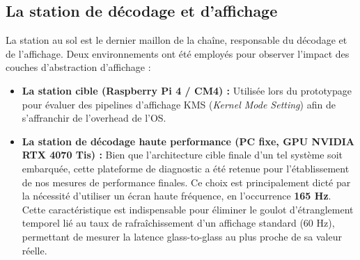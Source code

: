 \subsection{La station de décodage et d'affichage}
La station au sol est le dernier maillon de la chaîne, responsable du décodage et de l'affichage. Deux 
environnements ont été employés pour observer l'impact des couches d'abstraction d'affichage :
\begin{itemize}
    \item \textbf{La station cible (Raspberry Pi 4 / CM4) :} Utilisée lors du prototypage pour évaluer 
    des pipelines d'affichage KMS (\textit{Kernel Mode Setting}) afin de s'affranchir de l'overhead de l'OS. 
    \item \textbf{La station de décodage haute performance (PC fixe, GPU NVIDIA RTX 4070 Tis) :} Bien que l'architecture 
    cible finale d'un tel système soit embarquée, cette plateforme de diagnostic a été retenue pour l'établissement 
    de nos mesures de performance finales. Ce choix est principalement dicté par la nécessité d'utiliser un écran 
    haute fréquence, en l'occurrence \textbf{165 Hz}. Cette caractéristique est indispensable pour éliminer le goulot d'étranglement 
    temporel lié au taux de rafraîchissement d'un affichage standard (60 Hz), permettant de mesurer la latence glass-to-glass au 
    plus proche de sa valeur réelle.
\end{itemize}

